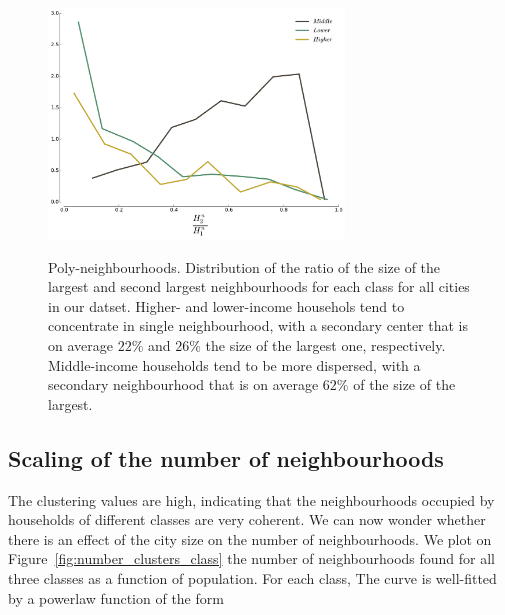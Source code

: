 \begin{figure} 
    \includegraphics[width=0.7\textwidth]{gfx/chapter-segregation/neighbourhoods_polycentrism.pdf}\\
    \caption{{Poly-neighbourhoods. } Distribution of the ratio of the size of the
        largest and second largest neighbourhoods for each class for all cities in our
        datset. Higher- and lower-income househols tend to concentrate in single
        neighbourhood, with a secondary center that is on average $22\%$ and
        $26\%$ the size of the largest one, respectively. Middle-income
        households tend to be more dispersed, with a secondary neighbourhood that is on
        average $62\%$ of the size of the largest.} 
        \label{fig:polycentrism} 
\end{figure}

 \subsection{Scaling of the number of neighbourhoods}
       \label{ssub:dependence_on_city_size}
       
The clustering values are high, indicating that the neighbourhoods occupied by
households of different classes are very coherent. We can now wonder whether
there is an effect of the city size on the number of neighbourhoods. We plot on
Figure~\ref{fig:number_clusters_class} the number of neighbourhoods found for all
three classes as a function of population. For each class, The curve is
well-fitted by a powerlaw function of the form

